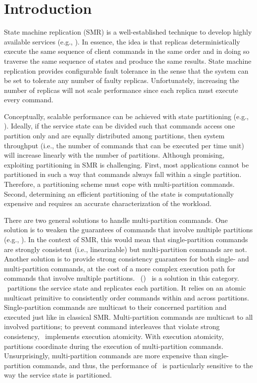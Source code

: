 \section{Introduction}

State machine replication (SMR) is a well-established technique to develop highly available services (e.g., \cite{Shvachko:2003,Ghemawat:2003,Burrows:2006,MacCormick:2004}).
In essence, the idea is that replicas deterministically execute the same sequence of client commands in the same order and in doing so traverse the same sequence of states and produce the same results.
State machine replication provides configurable fault tolerance in the sense that the system can be set to tolerate any number of faulty replicas.
Unfortunately, increasing the number of replicas will not scale performance since each replica must execute every command.

Conceptually, scalable performance can be achieved with state partitioning (e.g., \cite{facebookTAO, sciascia2012sdur, Aguilera:2007}).
Ideally, if the service state can be divided such that commands access one partition only and are equally distributed among partitions, then system throughput (i.e., the number of commands that can be executed per time unit) will increase linearly with the number of partitions.
Although promising, exploiting partitioning in SMR is challenging.
First, most applications cannot be partitioned in such a way that commands always fall within a single partition.
Therefore, a partitioning scheme must cope with multi-partition commands.
Second, determining an efficient partitioning of the state is computationally expensive and requires an accurate characterization of the workload.

There are two general solutions to handle multi-partition commands.
One solution is to weaken the guarantees of commands that involve multiple partitions (e.g., \cite{facebookTAO}).
In the context of SMR, this would mean that single-partition commands are strongly consistent (i.e., linearizable) but multi-partition commands are not.
Another solution is to provide strong consistency guarantees for both single- and multi-partition commands, at the cost of a more complex execution path for commands that involve multiple partitions.
\ssmrlong\ (\ssmr)~\cite{bezerra2014ssmr} is a solution in this category.
\ssmr\ partitions the service state and replicates each partition.
It relies on an atomic multicast primitive to consistently order commands within and across partitions. 
Single-partition commands are multicast to their concerned partition and executed just like in classical SMR.
Multi-partition commands are multicast to all involved partitions; to prevent command interleaves that violate strong consistency, \ssmr\ implements execution atomicity.
With execution atomicity, partitions coordinate during the execution of multi-partition commands.
Unsurprisingly, multi-partition commands are more expensive than single-partition commands, and thus, the performance of \ssmr\ is particularly sensitive to the way the service state is partitioned.

